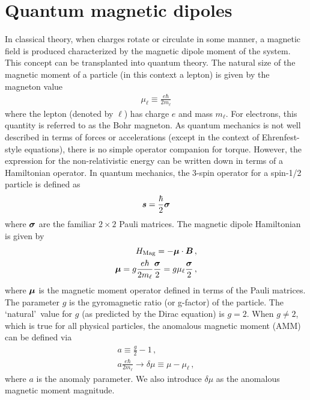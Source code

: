 \section{Quantum magnetic dipoles}
\label{sec:mom}
In classical theory, when charges rotate or circulate in some manner, a magnetic field is produced characterized by the magnetic dipole moment of the system. This concept can be transplanted into quantum theory. The natural size of the magnetic moment of a particle (in this context a lepton) is given by the magneton value
\begin{align}
    \label{mag:1}
    \mu_{\ell}\equiv\frac{e\hbar}{2m_{\ell}}
\end{align}
where the lepton (denoted by $\ell$) has charge $e$ and mass $m_{\ell}$. For electrons, this quantity is referred to as the Bohr magneton. As quantum mechanics is not well described in terms of forces or accelerations (except in the context of Ehrenfest-style equations), there is no simple operator companion for torque. However, the expression for the non-relativistic energy can be written down in terms of a Hamiltonian operator. In quantum mechanics, the 3-spin operator for a spin-1/2 particle is defined as
\begin{align}
    \label{qspin:1}
    \boldsymbol{ s}=\frac{\hbar}{2}\boldsymbol{\sigma}
\end{align}
where $\boldsymbol{\sigma}$ are the familiar $2\times2$ Pauli matrices. The magnetic dipole Hamiltonian is given by
\begin{align}
	\label{mag:2}
    {H}_{\mathrm{Mag}}=-\boldsymbol{\mu}\cdot\boldsymbol{B}\,,\\
    \boldsymbol{\mu}=g\frac{e\hbar}{2m_{\ell}}\frac{\boldsymbol{\sigma}}{2}=g\mu_{\ell}\frac{\boldsymbol{\sigma}}{2}\,,
\end{align}
where $\boldsymbol{\mu}$ is the magnetic moment operator defined in terms of the Pauli matrices. The parameter $g$ is the gyromagnetic ratio (or g-factor) of the particle. The \lq natural\rq\ value for $g$ (as predicted by the Dirac equation) is $g=2$. When $g\neq2$, which is true for all physical particles, the anomalous magnetic moment (AMM) can be defined via 
\begin{align}
    \label{amm:1}
    a\equiv\frac{g}{2}-1\,,\\
    \label{amm:2} a\frac{e\hbar}{2m_{\ell}}\rightarrow\delta\mu\equiv\mu-\mu_{\ell}\,,
\end{align}
where $a$ is the anomaly parameter. We also introduce $\delta\mu$ as the anomalous magnetic moment magnitude.

